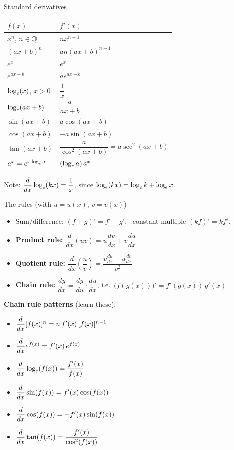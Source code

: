 \begin{cols}[0.47]
\begin{keyres}{Standard derivatives}
\renewcommand{\arraystretch}{1.45}
\begin{tabular}{@{}l@{\quad}l@{}}
$f(x)$ & $f'(x)$ \\ \hline
$x^n$, $n\in\mathbb{Q}$ & $nx^{n-1}$ \\
$(ax+b)^n$ & $an(ax+b)^{n-1}$ \\
$e^{x}$ & $e^{x}$ \\
$e^{ax+b}$ & $ae^{ax+b}$ \\
$\log_e(x)$, $x>0$ & $\dfrac1x$ \\
$\log_e(ax+b)$ & $\dfrac{a}{ax+b}$ \\
$\sin(ax+b)$ & $a\cos(ax+b)$ \\
$\cos(ax+b)$ & $-a\sin(ax+b)$ \\
$\tan(ax+b)$ & $\dfrac{a}{\cos^2(ax+b)}=a\sec^2(ax+b)$ \\
$a^x=e^{x\log_e a}$ & $(\log_e a)\,a^x$ \\
\end{tabular}
\par\smallskip
{\small Note: $\dfrac{d}{dx}\log_e(kx)=\dfrac1x$, since $\log_e(kx)=\log_e k+\log_e x$.}
\end{keyres}
\nextcol[0.505]
\begin{keyres}{The rules (with $u=u(x)$, $v=v(x)$)}
\begin{itemize}
  \item Sum/difference: $(f\pm g)'=f'\pm g'$; \ constant multiple $(kf)'=kf'$.
  \item \textbf{Product rule:} $\dfrac{d}{dx}(uv)=u\dfrac{dv}{dx}+v\dfrac{du}{dx}$
  \item \textbf{Quotient rule:} $\dfrac{d}{dx}\!\left(\dfrac uv\right)=\dfrac{v\frac{du}{dx}-u\frac{dv}{dx}}{v^2}$
  \item \textbf{Chain rule:} $\dfrac{dy}{dx}=\dfrac{dy}{du}\cdot\dfrac{du}{dx}$, i.e.\ $\big(f(g(x))\big)'=f'(g(x))\,g'(x)$
\end{itemize}
\textbf{Chain rule patterns} (learn these):
\begin{itemize}
  \item $\dfrac{d}{dx}[f(x)]^n=n\,f'(x)\,[f(x)]^{n-1}$
  \item $\dfrac{d}{dx} e^{f(x)}=f'(x)\,e^{f(x)}$
  \item $\dfrac{d}{dx}\log_e(f(x))=\dfrac{f'(x)}{f(x)}$
  \item $\dfrac{d}{dx}\sin(f(x))=f'(x)\cos(f(x))$
  \item $\dfrac{d}{dx}\cos(f(x))=-f'(x)\sin(f(x))$
  \item $\dfrac{d}{dx}\tan(f(x))=\dfrac{f'(x)}{\cos^2(f(x))}$
\end{itemize}
\end{keyres}
\end{cols}

